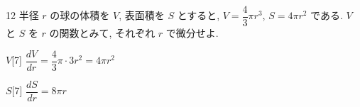 \documentclass[14pt,dvipdfmx]{jsarticle}
\begin{document}
\vspace{0.5em}
\begin{practiceprob}{12}
  半径 $r$ の球の体積を $V$, 表面積を $S$ とすると,
  $V=\dfrac{4}{3}\pi r^{3}$, $S=4\pi r^{2}$ である.
  $V$ と $S$ を $r$ の関数とみて, それぞれ $r$ で微分せよ.
\end{practiceprob}
\vspace{0.5em}
\begin{answerbox}{$V$}[7]
  $\dfrac{dV}{dr}=\dfrac{4}{3}\pi\cdot 3r^{2}=4\pi r^{2}$
\end{answerbox}
\vspace{-0.25em}
\begin{answerbox}{$S$}[7]
  $\dfrac{dS}{dr}=8\pi r$
\end{answerbox}

\vfill
\nextpage

\vspace{-1.4zw}%

\end{document}

